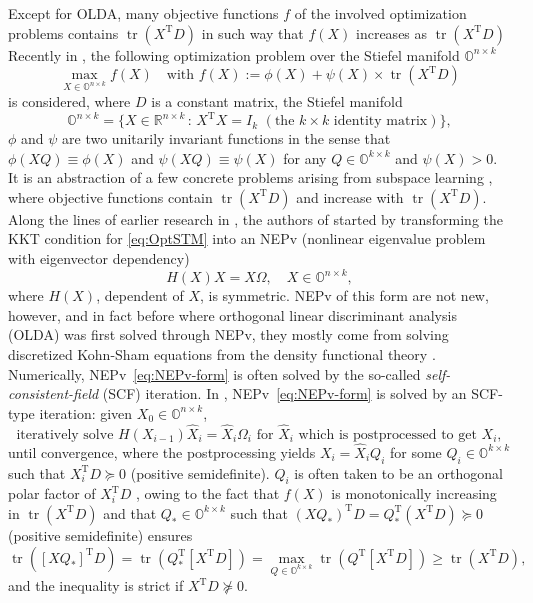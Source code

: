 \documentclass[11pt]{article}
\def\bbO{\mathbb{O}}
\def\bbR{\mathbb{R}}
\DeclareMathOperator{\tr}{tr}
\DeclareMathOperator{\T}{T}
\def\what{\widehat}
\theoremstyle{definition}
\numberwithin{equation}{section}
\numberwithin{figure}{section}
\numberwithin{table}{section}
\begin{document}
Except for OLDA,
many objective functions $f$ of the involved optimization problems contains $\tr(X^{\T}D)$ in such way that
$f(X)$ increases as $\tr(X^{\T}D)$
\fi
Recently in \cite{luli:2022}, the following optimization problem over the Stiefel manifold $\bbO^{n\times k}$
\begin{equation}\label{eq:OptSTM}
\max_{X\in\bbO^{n\times k}} f(X)\quad\mbox{with}\,\, f(X):=\phi(X)+\psi(X)\times\tr(X^{\T}D)
\end{equation}
is  considered, where $D$ is a constant matrix, the Stiefel manifold
$$
\bbO^{n\times k}=\{X\in\bbR^{n\times k}\,:\, X^{\T}X=I_k\,\,(\mbox{the $k\times k$ identity matrix})\},
$$
$\phi$ and $\psi$ are two unitarily invariant functions in the sense
that $\phi(XQ)\equiv\phi(X)$ and $\psi(XQ)\equiv\psi(X)$ for any $Q\in\bbO^{k\times k}$ and $\psi(X)>0$.
It is an abstraction of a few concrete problems arising from subspace learning
\cite{wazl:2022a,wazl:2022,zhys:2020,zhwb:2022},
where objective functions  contain $\tr(X^{\T}D)$ and
increase with $\tr(X^{\T}D)$.
Along the lines of earlier research in \cite{wazl:2022,zhys:2020,zhwb:2022},
the authors of \cite{luli:2022} started by transforming the KKT condition for \eqref{eq:OptSTM}
into an NEPv (nonlinear eigenvalue problem with eigenvector dependency)
\begin{equation}\label{eq:NEPv-form}
H(X)X=X\Omega,\quad X\in\bbO^{n\times k},
\end{equation}
where $H(X)$, dependent of $X$, is symmetric. NEPv of this form are not new, however, and in fact before
\cite{zhln:2010,zhln:2013} where orthogonal linear discriminant analysis (OLDA)
was first solved through NEPv, they mostly come from solving discretized
Kohn-Sham equations from the density functional theory \cite{hoko:64,kosh:1965,robl:2012,yaml:2009}.
Numerically, NEPv~\eqref{eq:NEPv-form} is often solved by the so-called {\em self-consistent-field\/} (SCF) iteration.
In \cite{luli:2022}, NEPv~\eqref{eq:NEPv-form} is solved by an SCF-type iteration:
given $X_0\in\bbO^{n\times k}$,
\begin{equation}\label{eq:SCF1}
\mbox{iteratively solve $H(X_{i-1})\what X_i=\what X_i\Omega_i$ for $\what X_i$ which is postprocessed to get $X_i$},
\end{equation}
until convergence, where the postprocessing yields $X_i=\what X_iQ_i$ for some $Q_i\in\bbO^{k\times k}$ such that
$X_i^{\T}D\succeq 0$ (positive semidefinite). $Q_i$ is often taken to be an orthogonal polar factor of
$X_i^{\T}D$ \cite{luli:2022,wazl:2022,zhys:2020,zhwb:2022},
owing to the fact that $f(X)$  is monotonically increasing
in $\tr(X^{\T}D)$ and that $Q_*\in\bbO^{k\times k}$ such that
$(XQ_*)^{\T}D=Q_*^{\T}(X^{\T}D)\succeq 0$ (positive semidefinite) ensures \cite{luli:2022,wazl:2022}
\begin{equation}\label{eq:tr-incr}
\tr([XQ_*]^{\T}D)=\tr(Q_*^{\T}[X^{\T}D])=\max_{Q\in\bbO^{k\times k}}\tr(Q^{\T}[X^{\T}D])\ge\tr( X^{\T}D),
\end{equation}
and the inequality is strict if $X^{\T}D\not\succeq 0$.
\end{document}
